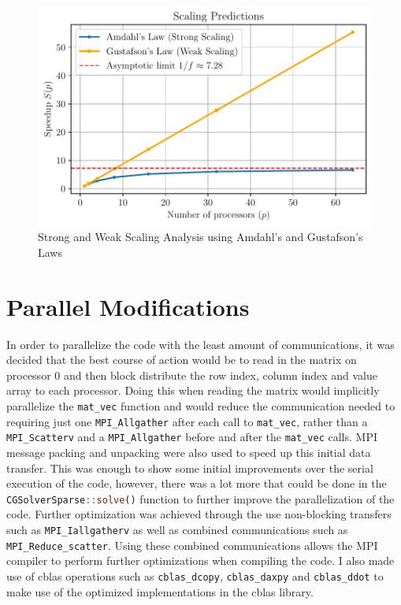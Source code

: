 \begin{figure}[h!]
    \centering
    \includegraphics[width=\textwidth]{plots/scaling_laws.pdf}
    \caption{Strong and Weak Scaling Analysis using Amdahl's and Gustafson's Laws}
    \label{fig:AmdahlPlot}
\end{figure}
\FloatBarrier

\section{Parallel Modifications}
In order to parallelize the code with the least amount of communications, it was decided that the best course of action
would be to read in the matrix on processor 0 and then block distribute the row index, column index and value array to
each processor. Doing this when reading the matrix would implicitly parallelize the \lstinline[language=Julia]|mat_vec|
function and would reduce the communication needed to requiring just one \lstinline[language=Julia]|MPI_Allgather| after
each call to \lstinline[language=Julia]|mat_vec|, rather than a \lstinline[language=Julia]|MPI_Scatterv| and a
\lstinline[language=Julia]|MPI_Allgather| before and after the \lstinline[language=Julia]|mat_vec| calls. MPI message
packing and unpacking were also used to speed up this initial data transfer. This was enough to show some initial
improvements over the serial execution of the code, however, there was a lot more that could be done in the
\lstinline[language=Julia]|CGSolverSparse::solve()| function to further improve the parallelization of the code. Further
optimization was achieved through the use non-blocking transfers such as \lstinline[language=Julia]|MPI_Iallgatherv| as
well as combined communications such as \lstinline[language=Julia]|MPI_Reduce_scatter|. Using these combined
communications allows the MPI compiler to perform further optimizations when compiling the code. I also made use of
cblas operations such as \lstinline[language=Julia]|cblas_dcopy|, \lstinline[language=Julia]|cblas_daxpy| and
\lstinline[language=Julia]|cblas_ddot| to make use of the optimized implementations in the cblas library.

